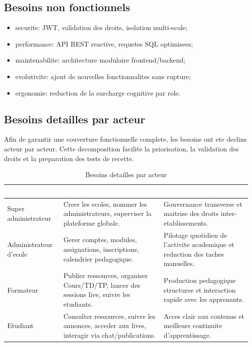 ﻿\documentclass[12pt,a4paper,oneside]{report}
\begin{document}
\subsection{Besoins non fonctionnels}

\begin{itemize}
  \item securite: JWT, validation des droits, isolation multi-ecole;
  \item performance: API REST reactive, requetes SQL optimisees;
  \item maintenabilite: architecture modulaire frontend/backend;
  \item evolutivite: ajout de nouvelles fonctionnalites sans rupture;
  \item ergonomie: reduction de la surcharge cognitive par role.
\end{itemize}

\subsection{Besoins detailles par acteur}

Afin de garantir une couverture fonctionnelle complete, les besoins ont ete declins acteur par acteur. Cette decomposition facilite la priorisation, la validation des droits et la preparation des tests de recette.

\renewcommand{\arraystretch}{1.35}
\begin{longtable}{|p{2.8cm}|p{4.6cm}|p{4.6cm}|}
\caption{Besoins detailles par acteur}\label{tab:besoins_acteurs}\\
\hline
\rowcolor{ustoblue}
\textcolor{white}{\textbf{Acteur}} &
\textcolor{white}{\textbf{Besoins prioritaires}} &
\textcolor{white}{\textbf{Valeur attendue}} \\
\hline
Super administrateur &
Creer les ecoles, nommer les administrateurs, superviser la plateforme globale. &
Gouvernance transverse et maitrise des droits inter-etablissements. \\
\hline
Administrateur d'ecole &
Gerer comptes, modules, assignations, inscriptions, calendrier pedagogique. &
Pilotage quotidien de l'activite academique et reduction des taches manuelles. \\
\hline
Formateur &
Publier ressources, organiser Cours/TD/TP, lancer des sessions live, suivre les etudiants. &
Production pedagogique structuree et interaction rapide avec les apprenants. \\
\hline
Etudiant &
Consulter ressources, suivre les annonces, acceder aux lives, interagir via chat/publications. &
Acces clair aux contenus et meilleure continuite d'apprentissage. \\
\hline
\end{longtable}
\end{document}
